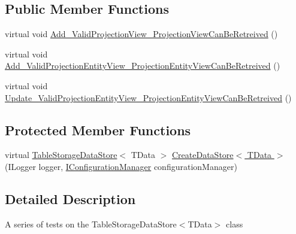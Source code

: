 \subsection*{Public Member Functions}
\begin{DoxyCompactItemize}
\item 
virtual void \hyperlink{classCqrs_1_1Azure_1_1BlobStorage_1_1Test_1_1Integration_1_1TableStorageDataStoreTests_a4d5cbb9f8690e2eff9529966e6816b5c_a4d5cbb9f8690e2eff9529966e6816b5c}{Add\+\_\+\+Valid\+Projection\+View\+\_\+\+Projection\+View\+Can\+Be\+Retreived} ()
\item 
virtual void \hyperlink{classCqrs_1_1Azure_1_1BlobStorage_1_1Test_1_1Integration_1_1TableStorageDataStoreTests_acd703f5ee0699216338b5cd5e41d771a_acd703f5ee0699216338b5cd5e41d771a}{Add\+\_\+\+Valid\+Projection\+Entity\+View\+\_\+\+Projection\+Entity\+View\+Can\+Be\+Retreived} ()
\item 
virtual void \hyperlink{classCqrs_1_1Azure_1_1BlobStorage_1_1Test_1_1Integration_1_1TableStorageDataStoreTests_ae2ea908fde732d4466091b01597918c6_ae2ea908fde732d4466091b01597918c6}{Update\+\_\+\+Valid\+Projection\+Entity\+View\+\_\+\+Projection\+Entity\+View\+Can\+Be\+Retreived} ()
\end{DoxyCompactItemize}
\subsection*{Protected Member Functions}
\begin{DoxyCompactItemize}
\item 
virtual \hyperlink{classCqrs_1_1Azure_1_1BlobStorage_1_1DataStores_1_1TableStorageDataStore}{Table\+Storage\+Data\+Store}$<$ T\+Data $>$ \hyperlink{classCqrs_1_1Azure_1_1BlobStorage_1_1Test_1_1Integration_1_1TableStorageDataStoreTests_a76d6ef854f24e39f80de66e86cfa967c_a76d6ef854f24e39f80de66e86cfa967c}{Create\+Data\+Store$<$ T\+Data $>$} (I\+Logger logger, \hyperlink{interfaceCqrs_1_1Configuration_1_1IConfigurationManager}{I\+Configuration\+Manager} configuration\+Manager)
\end{DoxyCompactItemize}


\subsection{Detailed Description}
A series of tests on the Table\+Storage\+Data\+Store$<$\+T\+Data$>$ class 



